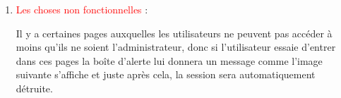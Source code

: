 \documentclass{article}
\begin{document}
\begin{enumerate}
 \vspace{0.7cm}
               \hspace*{-0.7in}
               \noindent{}  
  
  
  
  
  
  
	\vspace{3cm}
\item \textcolor{red}{\huge Les choses non fonctionnelles} :  
  
  Il y a certaines pages auxquelles les utilisateurs ne peuvent pas accéder à moins qu'ils ne soient l'administrateur, donc si l'utilisateur essaie d'entrer dans ces pages la boîte d'alerte lui donnera un message comme l'image suivante s'affiche et juste après cela, la session sera automatiquement détruite.
  
   
  
\vspace{0.7cm}
               \hspace*{-0.7in}
               \noindent{} 



\end{enumerate}
\end{document}
